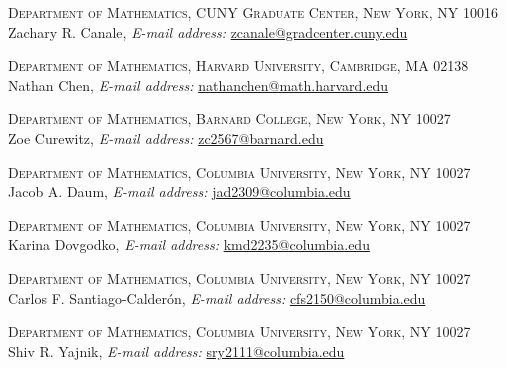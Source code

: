 \documentclass[fontsize=11pt,reqno]{amsart}
\theoremstyle{definition}
\theoremstyle{remark}
\begin{document}




\footnotesize{

\noindent \textsc{Department of Mathematics, CUNY Graduate Center, New York, NY 10016} \\
\noindent Zachary R. Canale, \textit{E-mail address:} \href{mailto:zcanale@gradcenter.cuny.edu}{zcanale@gradcenter.cuny.edu}

\noindent \textsc{Department of Mathematics, Harvard University, Cambridge, MA 02138} \\
\noindent Nathan Chen, \textit{E-mail address:} \href{mailto:nathanchen@math.harvard.edu}{nathanchen@math.harvard.edu}

\noindent \textsc{Department of Mathematics, Barnard College, New York, NY 10027} \\
\noindent Zoe Curewitz, \textit{E-mail address:} \href{mailto:zc2567@barnard.edu}{zc2567@barnard.edu}

\noindent \textsc{Department of Mathematics, Columbia University, New York, NY 10027} \\
\noindent Jacob A. Daum, \textit{E-mail address:} \href{mailto:jad2309@columbia.edu}{jad2309@columbia.edu}

\noindent \textsc{Department of Mathematics, Columbia University, New York, NY 10027} \\
\noindent Karina Dovgodko, \textit{E-mail address:} \noindent \href{mailto:kmd2235@columbia.edu}{kmd2235@columbia.edu}

\noindent \textsc{Department of Mathematics, Columbia University, New York, NY 10027} \\
\noindent Carlos F. Santiago-Calder\'{o}n, \textit{E-mail address:} \href{mailto:cfs2150@columbia.edu}{cfs2150@columbia.edu}

\noindent \textsc{Department of Mathematics, Columbia University, New York, NY 10027} \\
\noindent Shiv R. Yajnik, \textit{E-mail address:} \href{mailto:sry2111@columbia.edu}{sry2111@columbia.edu}

}
\end{document}
